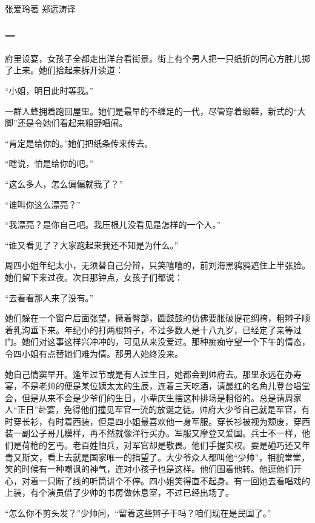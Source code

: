 \begin{center}
    张爱玲著 郑远涛译
\end{center}


\subsubsection*{一}

\par 府里设宴，女孩子全都走出洋台看街景。街上有个男人把一只纸折的同心方胜儿掷了上来。她们拾起来拆开读道：
\par “小姐，明日此时等我。”
\par 一群人蜂拥着跑回屋里。她们是最早的不缠足的一代，尽管穿着缎鞋，新式的“大脚”还是令她们看起来粗野嘈闹。
\par “肯定是给你的。”她们把纸条传来传去。
\par “瞎说，怕是给你的吧。”
\par “这么多人，怎么偏偏就我了？”
\par “谁叫你这么漂亮？”
\par “我漂亮？是你自己吧。我压根儿没看见是怎样的一个人。”
\par “谁又看见了？大家跑起来我还不知是为什么。”
\par 周四小姐年纪太小，无须替自己分辩，只笑嘻嘻的，前刘海黑鸦鸦遮住上半张脸。她们留下来过夜。次日那钟点，女孩子们都说：
\par “去看看那人来了没有。”
\par 她们躲在一个窗户后面张望，撅着臀部，圆鼓鼓的仿佛要胀破提花绸袴，粗辫子顺着乳沟垂下来。年纪小的打两根辫子，不过多数人是十八九岁，已经定了亲等过门。她们对这事这样兴冲冲的，可见从来没爱过。那种痴痴守望一个下午的情态，令四小姐有点替她们难为情。那男人始终没来。
\par 她自己情窦早开。逢年过节或是有人过生日，她都会到帅府去。那里永远在办寿宴，不是老帅的便是某位姨太太的生辰，连着三天吃酒，请最红的名角儿登台唱堂会，但是从来不会是少爷们的生日，小辈庆生摆这种排场是粗俗的。总是请周家人“正日”赴宴，免得他们撞见军官一流的放诞之徒。帅府大少爷自己就是军官，有时穿长衫，有时着西装，但是四小姐最喜欢他一身军服。穿长衫被视为颓废，穿西装一副公子哥儿模样，再不然就像洋行买办。军服又摩登又爱国。兵士不一样，他们是荷枪的乞丐。老百姓怕兵，对军官却是敬畏。他们手握实权。要是碰巧还又年青又斯文，看上去就是国家唯一的指望了。大少爷众人都叫他“少帅”，相貌堂堂，笑的时候有一种嘲讽的神气，连对小孩子也是这样。他们围着他转。他逗他们开心，对着一只断了线的听筒讲个不停。四小姐笑得直不起身。有一回她去看唱戏的上装，有个演员借了少帅的书房做休息室，不过已经出场了。
\par “怎么你不剪头发？”少帅问，“留着这些辫子干吗？咱们现在是民国了。”
